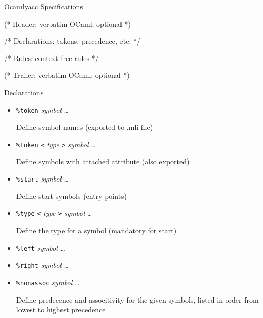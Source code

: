 \documentclass{plt}
\begin{document}
%
%
%
%
%
%

\begin{frame}[fragile]{Ocamlyacc Specifications}

\begin{ocamlyacc}
  (* Header: verbatim OCaml; optional *)

  /* Declarations: tokens, precedence, etc. */


  /* Rules: context-free rules */


  (* Trailer: verbatim OCaml; optional *)

\end{ocamlyacc}

\end{frame}

\begin{frame}[fragile]{Declarations}

\parskip=1pc

\begin{itemize}
\item \verb|%token| \emph{symbol} \ldots

 Define symbol names (exported to .mli file)

\item \verb|%token| \verb|<| \emph{type} \verb|>| \emph{symbol} \ldots

 Define symbols with attached attribute (also exported)

\item \verb|%start| \emph{symbol} \ldots

Define start symbols (entry points)

\item \verb|%type| \verb|<| \emph{type} \verb|>| \emph{symbol} \ldots

Define the type for a symbol (mandatory for start)

\item \verb|%left| \emph{symbol} \ldots

\item \verb|%right| \emph{symbol} \ldots

\item \verb|%nonassoc| \emph{symbol} \ldots

Define predecence and associtivity for the given symbols, listed in
order from lowest to highest precedence
\end{itemize}

\end{frame}
\end{document}

